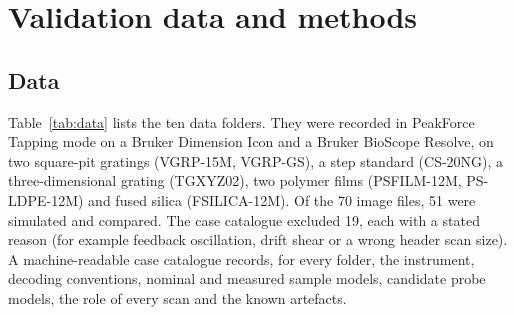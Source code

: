 \documentclass[preprint,12pt]{elsarticle}
\begin{document}
\section{Validation data and methods}
\label{sec:methods}

\subsection{Data}
\label{sec:samples}

Table~\ref{tab:data} lists the ten data folders. They were recorded in PeakForce Tapping mode on a
Bruker Dimension Icon and a Bruker BioScope Resolve, on two square-pit gratings (VGRP-15M, VGRP-GS),
a step standard (CS-20NG), a three-dimensional grating (TGXYZ02), two polymer films (PSFILM-12M,
PS-LDPE-12M) and fused silica (FSILICA-12M). Of the 70 image files, 51 were simulated and compared.
The case catalogue excluded 19, each with a stated reason (for example feedback oscillation, drift
shear or a wrong header scan size). A machine-readable case catalogue records, for every folder,
the instrument, decoding conventions, nominal and measured sample models, candidate probe models,
the role of every scan and the known artefacts.
\end{document}
